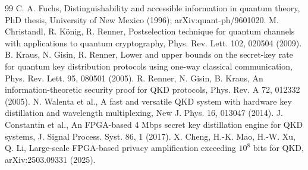 \documentclass[aps,pra,twocolumn,superscriptaddress,nofootinbib]{revtex4-2}
\begin{document}
\begin{thebibliography}{99}
 C. A. Fuchs, Distinguishability and accessible information in quantum theory, PhD thesis, University of New Mexico (1996); arXiv:quant-ph/9601020.
 M. Christandl, R. König, R. Renner, Postselection technique for quantum channels with applications to quantum cryptography, Phys. Rev. Lett. 102, 020504 (2009).
 B. Kraus, N. Gisin, R. Renner, Lower and upper bounds on the secret-key rate for quantum key distribution protocols using one-way classical communication, Phys. Rev. Lett. 95, 080501 (2005).
 R. Renner, N. Gisin, B. Kraus, An information-theoretic security proof for QKD protocols, Phys. Rev. A 72, 012332 (2005).
 N. Walenta et al., A fast and versatile QKD system with hardware key distillation and wavelength multiplexing, New J. Phys. 16, 013047 (2014).
 J. Constantin et al., An FPGA-based 4 Mbps secret key distillation engine for QKD systems, J. Signal Process. Syst. 86, 1 (2017).
 X. Cheng, H.-K. Mao, H.-W. Xu, Q. Li, Large-scale FPGA-based privacy amplification exceeding $10^8$ bits for QKD, arXiv:2503.09331 (2025).
\end{thebibliography}
\end{document}
